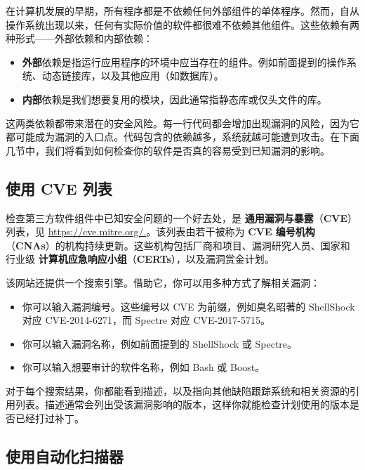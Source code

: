\label{idx:1048}
在计算机发展的早期，所有程序都是不依赖任何外部组件的单体程序。然而，自从操作系统出现以来，任何有实际价值的软件都很难不依赖其他组件。这些依赖有两种形式——外部依赖和内部依赖：

\begin{itemize}
\label{idx:1049}
\item \textbf{外部}依赖是指运行应用程序的环境中应当存在的组件。例如前面提到的操作系统、动态链接库，以及其他应用（如数据库）。
\label{idx:1050}
\item \textbf{内部}依赖是我们想要复用的模块，因此通常指静态库或仅头文件的库。
\end{itemize}

这两类依赖都带来潜在的安全风险。每一行代码都会增加出现漏洞的风险，因为它都可能成为漏洞的入口点。代码包含的依赖越多，系统就越可能遭到攻击。在下面几节中，我们将看到如何检查你的软件是否真的容易受到已知漏洞的影响。

\subsection{使用 CVE 列表}

\label{idx:1051}
\label{idx:1052}
\label{idx:1053}
\label{idx:1054}
检查第三方软件组件中已知安全问题的一个好去处，是 \textbf{通用漏洞与暴露}（\textbf{CVE}）列表，见 \href{https://cve.mitre.org/.}{https://cve.mitre.org/.}。该列表由若干被称为 \textbf{CVE 编号机构}（\textbf{CNAs}）的机构持续更新。这些机构包括厂商和项目、漏洞研究人员、国家和行业级 \textbf{计算机应急响应小组}（\textbf{CERTs}），以及漏洞赏金计划。

该网站还提供一个搜索引擎。借助它，你可以用多种方式了解相关漏洞：

\begin{itemize}
\item 你可以输入漏洞编号。这些编号以 CVE 为前缀，例如臭名昭著的 ShellShock 对应 CVE-2014-6271，而 Spectre 对应 CVE-2017-5715。
\item 你可以输入漏洞名称，例如前面提到的 ShellShock 或 Spectre。
\item 你可以输入想要审计的软件名称，例如 Bash 或 Boost。
\end{itemize}

\label{idx:1055}
对于每个搜索结果，你都能看到描述，以及指向其他缺陷跟踪系统和相关资源的引用列表。描述通常会列出受该漏洞影响的版本，这样你就能检查计划使用的版本是否已经打过补丁。

\subsection{使用自动化扫描器}

